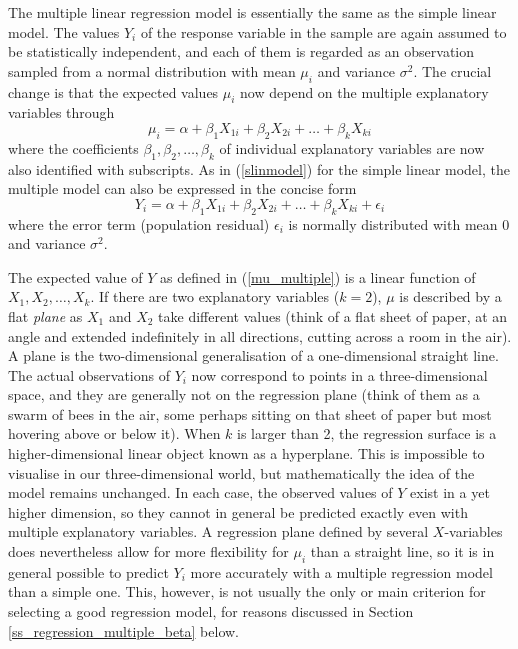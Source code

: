 The multiple linear regression model is essentially the same as the
simple linear model. The values $Y_{i}$ of the response variable in the
sample are again assumed to be statistically independent, and each of
them is regarded as an observation sampled from a normal distribution
with mean $\mu_{i}$ and variance $\sigma^{2}$. The crucial change is
that the expected values $\mu_{i}$ now depend on the multiple
explanatory variables through
\begin{equation}
\mu_{i} = \alpha +\beta_{1}X_{1i}+\beta_{2}X_{2i}+\dots+\beta_{k}X_{ki}
\label{mu_multiple}
\end{equation}
where the coefficients $\beta_{1}, \beta_{2}, \dots, \beta_{k}$ of
individual explanatory variables are now also identified with
subscripts. As in (\ref{slinmodel}) for the simple linear model, the
multiple model can also be expressed in the concise form
\begin{equation}
Y_{i} = \alpha
+\beta_{1}X_{1i}+\beta_{2}X_{2i}+\dots+\beta_{k}X_{ki}+\epsilon_{i}
\label{mlinmodel}
\end{equation}
where the error term (population residual) $\epsilon_{i}$ is normally
distributed with mean 0 and variance $\sigma^{2}$.

The expected value of $Y$ as defined in (\ref{mu_multiple}) is a linear
function of $X_{1}, X_{2}, \dots, X_{k}$. If there are two explanatory
variables ($k=2$), $\mu$ is described by a flat \emph{plane} as $X_{1}$
and $X_{2}$ take different values (think of a flat sheet of paper, at an
angle and extended indefinitely in all directions, cutting across a room
in the air). A plane is the two-dimensional generalisation of a
one-dimensional straight line. The actual observations of $Y_{i}$ now
correspond to points in a three-dimensional space, and they are generally
not on the regression plane (think of them as a swarm of bees in the
air, some perhaps sitting on that sheet of paper but most hovering above
or below it). When $k$ is larger than 2, the regression surface is a
higher-dimensional linear object known as a hyperplane. This is
impossible to visualise in our three-dimensional world, but
mathematically the idea of the model remains unchanged. In each case,
the observed values of $Y$ exist in a yet higher dimension, so they
cannot in general be predicted exactly even with multiple explanatory
variables. A regression plane defined by several $X$-variables does
nevertheless allow for more flexibility for $\mu_{i}$ than a straight
line, so it is in general possible to predict $Y_{i}$ more accurately
with a multiple regression model than a simple one. This, however, is
not usually the only or main criterion for selecting a good regression
model, for reasons discussed in Section
\ref{ss_regression_multiple_beta} below.

